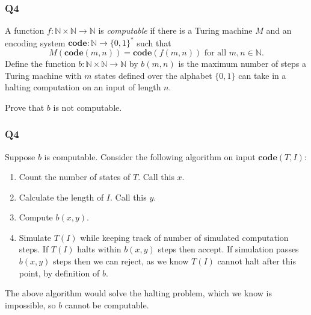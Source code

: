 \documentclass[handout]{beamer}
\newcommand{\co}{\mathbf{code}}
\begin{document}
\begin{frame}
\frametitle{Q4}
A function $f:\mathbb{N}\times\mathbb{N}\to\mathbb{N}$ is \emph{computable} if there is a Turing machine $M$ and an encoding system $\co:\mathbb{N}\to \{0,1\}^*$ such that \[M(\co(m,n))=\co(f(m,n))\text{ for all }m,n\in \mathbb{N}.\] 
Define the function $b:\mathbb{N}\times\mathbb{N}\to\mathbb{N}$ by $b(m,n)$ is the maximum number of steps a Turing machine with $m$ states defined over the alphabet $\{0,1\}$ can take in a halting computation on an input of length $n$. 
\newline

Prove that $b$ is not computable. 
\end{frame}

\begin{frame}
\frametitle{Q4}
Suppose $b$ is computable. Consider the following algorithm on input $\co(T,I)$:
\begin{enumerate}
\item Count the number of states of $T$. Call this $x$.
\item Calculate the length of $I$. Call this $y$.
\item Compute $b(x,y)$.
\item Simulate $T(I)$ while keeping track of number of simulated computation steps. If $T(I)$ halts within $b(x,y)$ steps then accept. If simulation passes $b(x,y)$ steps then we can reject, as we know $T(I)$ cannot halt after this point, by definition of $b$.
\end{enumerate}
The above algorithm would solve the halting problem, which we know is impossible, so $b$ cannot be computable.
\end{frame}
\end{document}
